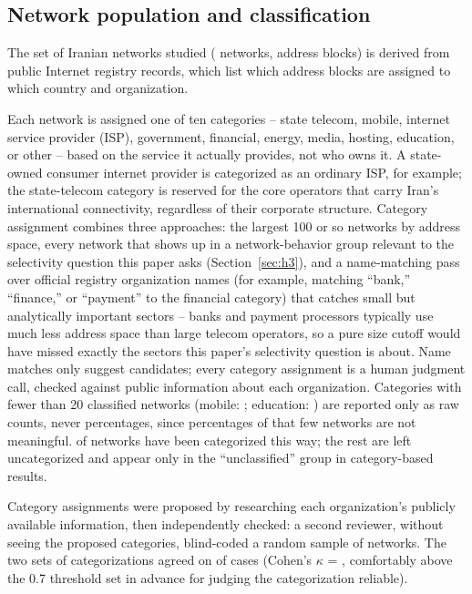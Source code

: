 \subsection{Network population and classification}

The set of Iranian networks studied (\nIrAsns{} networks, \nIrPrefixes{}
address blocks) is derived from public Internet registry records, which
list which address blocks are assigned to which country and organization.

Each network is assigned one of ten categories -- state telecom, mobile,
internet service provider (ISP), government, financial, energy, media,
hosting, education, or other -- based on the service it actually provides,
not who owns it. A state-owned consumer internet provider is categorized as
an ordinary ISP, for example; the state-telecom category is reserved for
the core operators that carry Iran's international connectivity,
regardless of their corporate structure. Category assignment combines
three approaches: the largest 100 or so networks by address space, every
network that shows up in a network-behavior group relevant to the
selectivity question this paper asks (Section~\ref{sec:h3}), and a
name-matching pass over official registry organization names (for example,
matching ``bank,'' ``finance,'' or ``payment'' to the financial category) that
catches small but analytically important sectors -- banks and payment
processors typically use much less address space than large telecom
operators, so a pure size cutoff would have missed exactly the sectors this
paper's selectivity question is about. Name matches only suggest
candidates; every category assignment is a human judgment call, checked
against public information about each organization. Categories with fewer
than 20 classified networks (mobile: \nTypeMobile{}; education:
\nTypeEducation{}) are reported only as raw counts, never percentages,
since percentages of that few networks are not meaningful. \nClassified{}
of \nIrAsns{} networks have been categorized this way; the rest are left
uncategorized and appear only in the ``unclassified'' group in
category-based results.

Category assignments were proposed by researching each organization's
publicly available information, then independently checked: a second
reviewer, without seeing the proposed categories, blind-coded a random
sample of \kappaN{} networks. The two sets of categorizations agreed on
\kappaAgreePct{} of cases (Cohen's $\kappa$ = \kappaValue{}, comfortably
above the 0.7 threshold set in advance for judging the categorization
reliable).

